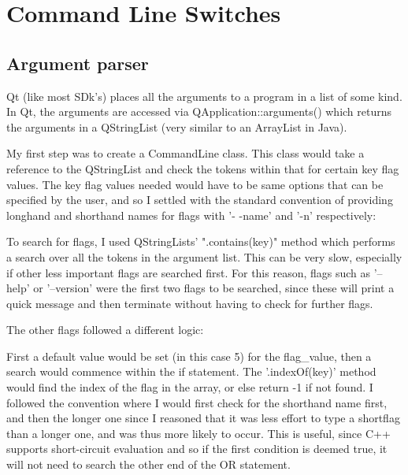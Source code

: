 \documentclass[11pt]{article} %
\begin{document}
\section{Command Line Switches}
\subsection{Argument parser}

Qt (like most SDk's) places all the arguments to a program in a list of some kind. In Qt, the arguments are accessed via QApplication::arguments() which returns the arguments in a QStringList (very similar to an ArrayList in Java).

My first step was to create a CommandLine class. This class would take a reference to the QStringList and check the tokens within that for certain key flag values. The key flag values needed would have to be same options that can be specified by the user, and so I settled with the standard convention of providing longhand and shorthand names for flags with '- -name' and '-n' respectively:
\begin{frame}[fragile]

\label{frame:help}
\end{frame}

To search for flags, I used QStringLists' ".contains(key)" method which performs a search over all the tokens in the argument list. This can be very slow, especially if other less important flags are searched first. 
For this reason, flags such as '--help' or '--version' were the first two flags to be searched, since these will print a quick message and then terminate without having to check for further flags.

The other flags followed a different logic:
\begin{frame}[fragile]

\end{frame}
 First a default value would be set (in this case 5) for the flag\_value, then a search would commence within the if statement.  The '.indexOf(key)' method would find the index of the flag in the array, or else return -1 if not found. I followed the convention where I would first check for the shorthand name first, and then the longer one since I reasoned that it was less effort to type a shortflag than a longer one, and was thus more likely to occur. This is useful, since C++ supports short-circuit evaluation and so if the first condition is deemed true, it will not need to search the other end of the OR statement.
\end{document}
